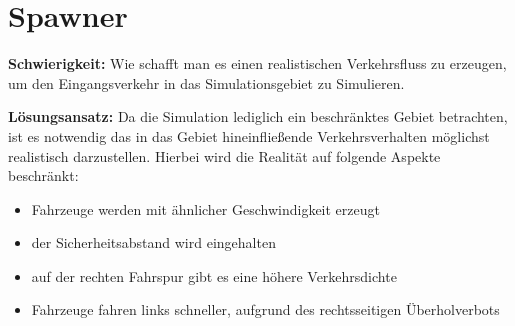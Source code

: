 \section{Spawner}
\textbf{Schwierigkeit:} Wie schafft man es einen realistischen Verkehrsfluss zu erzeugen, um den Eingangsverkehr in das Simulationsgebiet zu Simulieren.
\begin{addmargin}[25pt]{0pt}
	\item \textbf{Lösungsansatz:} Da die Simulation lediglich ein beschränktes Gebiet betrachten, ist es notwendig das in das Gebiet hineinfließende Verkehrsverhalten möglichst realistisch darzustellen. Hierbei wird die Realität auf folgende Aspekte beschränkt: 
	\begin{itemize}
		\item Fahrzeuge werden mit ähnlicher Geschwindigkeit erzeugt
		\item der Sicherheitsabstand wird eingehalten
		\item auf der rechten Fahrspur gibt es eine höhere Verkehrsdichte
		\item Fahrzeuge fahren links schneller, aufgrund des rechtsseitigen Überholverbots
	\end{itemize}
	

\end{addmargin}
